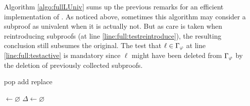 \documentclass{llncs}
\begin{document}
Algorithm \ref{algo:fullLUniv} sums up the previous remarks for an efficient implementation of
{\LowerUnivalents}. As noticed above, sometimes this algorithm may consider a subproof as univalent when it
is actually not. But as care is taken when reintroducing subproofs (at line \ref{line:full:testreintroduce}),
the resulting conclusion still subsumes the original.  The test that $\ell \in \Gamma_{\varphi}$
at line \ref{line:full:testactive} is mandatory since $\ell$ might have been deleted from
$\Gamma_{\varphi}$ by the deletion of previously collected subproofs.

\begin{algorithm}[pbt]
  \SetAlgoVlined
  \SetAlgoShortEnd

  \BlankLine

   {pop}
   {add}
   {replace}


  \Univ $\leftarrow \varnothing$ \;
  $\Delta \leftarrow \varnothing$ \;
  \BlankLine

\end{algorithm}
\end{document}
